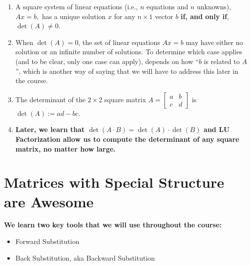 \documentclass[letterpaper]{book}
\begin{document}
\begin{tcolorbox}[sharp corners, colback=green!30, colframe=green!80!blue, title=\textbf{Enough Facts about the Determinant to Get Us Going}]
\begin{enumerate}[label={Fact~}{\arabic*}]

    \item \label{item:determinantFact1} A square system of linear equations (i.e.,  $n$ equations and $n$ unknowns), 
    $Ax=b,$
    has a unique solution $x$ for any $n\times 1$ vector $b$ \textbf{if, and only if}, $\det(A) \neq 0.$
    
     \item When $\det(A)=0$, the set of linear equations $Ax=b$ may have either no solution or an infinite number of solutions. To determine which case applies (and to be clear, only one case can apply), depends on how ``$b$ is related to $A$'', which is another way of saying that we will have to address this later in the course. 

     
    \item The determinant of the $2 \times 2$ square matrix 
    $A=\left[\begin{array}{cc} a & b \\ c & d \end{array} \right]$ is
  $\det(A):= a d - bc.$
  
  \item \textbf{Later, we learn that $\det(A\cdot B) = \det(A) \cdot \det(B)$ and LU Factorization allow us to compute the determinant of any square matrix, no matter how large.}
 
 
\end{enumerate}

\end{tcolorbox}

\setcounter{chapter}{3}
\setcounter{section}{-1}
\section{Matrices with Special Structure are Awesome}

{\bf \large We learn two key tools that we will use throughout the course:
\begin{itemize}
    \item Forward Substitution
    \item Back Substitution, aka Backward Substitution
\end{itemize}
}

\vspace*{1cm}
\end{document}
